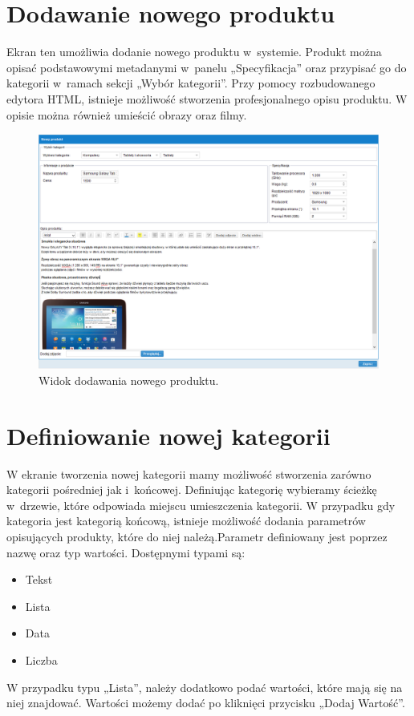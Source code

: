 \newpage
\section{Dodawanie nowego produktu}

Ekran ten umożliwia dodanie nowego produktu w~systemie. Produkt można opisać podstawowymi metadanymi w~panelu „Specyfikacja” oraz przypisać go do kategorii w~ramach sekcji „Wybór kategorii”. Przy pomocy rozbudowanego edytora HTML, istnieje możliwość stworzenia profesjonalnego opisu produktu. W opisie można również umieścić obrazy oraz filmy.

\begin{figure}[h]
	\centering
	\includegraphics[width=1.00\textwidth]{images/nowy_produkt.PNG}
	\caption{Widok dodawania nowego produktu.}
\end{figure}

\section{Definiowanie nowej kategorii}

W ekranie tworzenia nowej kategorii mamy możliwość stworzenia zarówno kategorii pośredniej jak i~końcowej. Definiując kategorię wybieramy ścieżkę w~drzewie, które odpowiada miejscu umieszczenia kategorii. W przypadku gdy kategoria jest kategorią końcową, istnieje możliwość dodania parametrów opisujących produkty, które do niej należą.Parametr definiowany jest poprzez nazwę oraz typ wartości. Dostępnymi typami są:
\begin{itemize}
\item Tekst
\item Lista
\item Data
\item Liczba
\end{itemize}
W przypadku typu „Lista”, należy dodatkowo podać wartości, które mają się na niej znajdować. Wartości  możemy dodać po kliknięci przycisku „Dodaj Wartość”.

